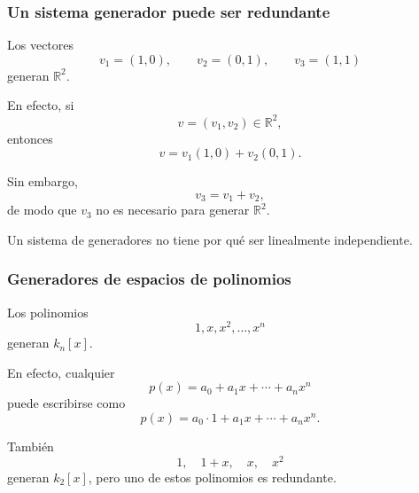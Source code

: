 \begin{frame}
    \frametitle{Un sistema generador puede ser redundante}

    \begin{example}
        Los vectores
        \[
            v_1=(1,0),\qquad
            v_2=(0,1),\qquad
            v_3=(1,1)
        \]
        generan \(\mathbb{R}^2\).

        En efecto, si
        \[
            v=(v_1,v_2)\in\mathbb{R}^2,
        \]
        entonces
        \[
            v=v_1(1,0)+v_2(0,1).
        \]

        Sin embargo,
        \[
            v_3=v_1+v_2,
        \]
        de modo que \(v_3\) no es necesario para generar
        \(\mathbb{R}^2\).
    \end{example}

    \medskip

    Un sistema de generadores no tiene por qué ser linealmente independiente.
\end{frame}


\begin{frame}
    \frametitle{Generadores de espacios de polinomios}

    \begin{example}
        Los polinomios
        \[
            1,x,x^2,\ldots,x^n
        \]
        generan \(k_n[x]\).

        En efecto, cualquier
        \[
            p(x)=a_0+a_1x+\cdots+a_nx^n
        \]
        puede escribirse como
        \[
            p(x)
            =
            a_0\cdot1+a_1x+\cdots+a_nx^n.
        \]
    \end{example}

    \begin{example}
        También
        \[
            1,\quad 1+x,\quad x,\quad x^2
        \]
        generan \(k_2[x]\), pero uno de estos polinomios es redundante.
    \end{example}
\end{frame}


